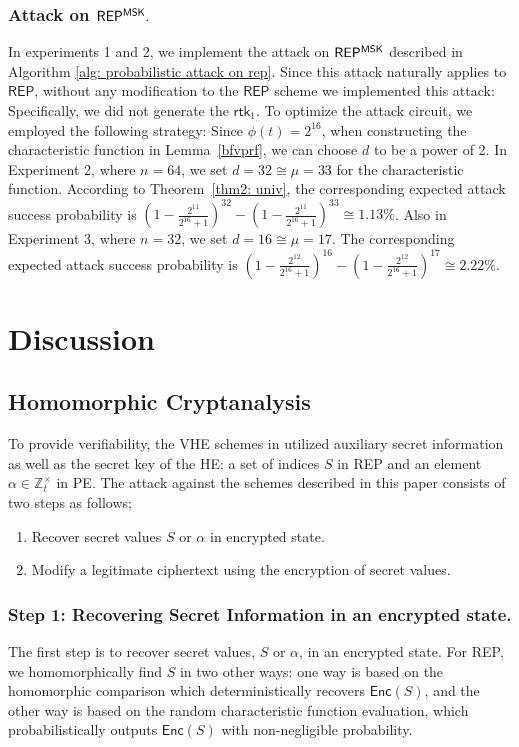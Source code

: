 \documentclass[runningheads]{llncs}
\newcommand{\Z}{\mathbb{Z}}
\newcommand{\rtk}{\textsf{rtk}{}}
\newcommand{\REP}{\textsf{REP}{}}
\newcommand{\PE}{\textsf{PE}{}}
\newcommand{\enc}{\textsf{Enc}}
\begin{document}
\subsubsection{Attack on $\REP^{\sf MSK}.$}
In experiments 1 and 2, we implement the attack on $\REP^{\sf MSK}$ described in Algorithm \ref{alg: probabilistic attack on rep}. Since this attack naturally applies to $\REP$, without any modification to the $\REP$ scheme we implemented this attack: Specifically, we did not generate the $\rtk_1$. To optimize the attack circuit, we employed the following strategy: Since \(\phi(t)=2^{16}\), when constructing the characteristic function in Lemma~\ref{bfvprf}, we can choose \(d\) to be a power of 2. In Experiment 2, where \(n=64\), we set \(d=32 \cong \mu=33\) for the characteristic function. According to Theorem~\ref{thm2: univ}, the corresponding expected attack success probability is $(1-\frac{2^{11}}{2^{16}+1})^{32} - (1-\frac{2^{11}}{2^{16}+1})^{33} \cong 1.13\%$. Also in Experiment 3, where \(n=32\), we set \(d=16 \cong \mu=17\). The corresponding expected attack success probability is $(1-\frac{2^{12}}{2^{16}+1})^{16} - (1-\frac{2^{12}}{2^{16}+1})^{17} \cong 2.22\%$.


\section{Discussion}\label{sec: Discussion}
    \subsection{Homomorphic Cryptanalysis}
    To provide verifiability, the VHE schemes in \cite{VE, cryptoeprint:PRF} utilized auxiliary secret information as well as the secret key of the HE: a set of indices $S$ in \REP{} and an element $\alpha \in \Z_t^\times$ in \PE{}. The attack against the schemes described in this paper consists of two steps as follows; 

        \begin{enumerate}
            \item Recover secret values $S$ or $\alpha$ in encrypted state.
            \item Modify a legitimate ciphertext using the encryption of secret values.
        \end{enumerate}

        \subsubsection{Step 1: Recovering Secret Information in an encrypted state.}
        The first step is to recover secret values, $S$ or $\alpha$, in an encrypted state.
        For \REP, we homomorphically find $S$ in two other ways: one way is based on the homomorphic comparison which deterministically recovers $\enc(S)$, and the other way is based on the random characteristic function evaluation, which probabilistically outputs $\enc(S)$ with non-negligible probability.
        
\end{document}
